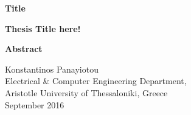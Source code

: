 {\selectfont

{}


\begin{center}
  \centering
  \textbf{\Large{Title}}
  \vspace{0.5cm}

  \textbf{\large{Thesis Title here!}}

  \vspace{1cm}

  \centering
  \textbf{Abstract}
\end{center}


\begin{flushright}
  \vspace{2cm}
  Konstantinos Panayiotou
  \\
  Electrical \& Computer Engineering Department,
  \\
  Aristotle University of Thessaloniki, Greece
  \\
  September 2016
\end{flushright}

}
